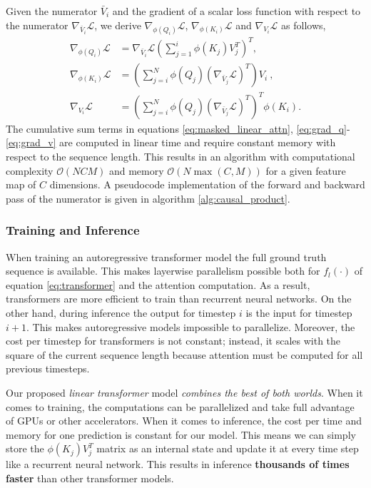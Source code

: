 \documentclass{article}
\newcommand{\linear}{\emph{linear transformer}}
\newcommand{\bigO}[1]{\mathcal{O}\left(#1\right)}
\newcommand{\fe}[1]{\phi\left(#1\right)}
\newcommand{\calL}{\mathcal{L}}
\begin{document}
Given the numerator $\bar{V}_i$ and the gradient of a scalar loss function with
respect to the numerator $\nabla_{\bar{V}_i}\calL$, we derive
$\nabla_{\fe{Q_i}}\calL$, $\nabla_{\fe{K_i}}\calL$ and $\nabla_{V_i}\calL$ as follows,
\begin{align}
    \nabla_{\fe{Q_i}} \calL &= \nabla_{\bar{V}_i}\calL
        \left(\sum_{j=1}^i \fe{K_j} V_j^T\right)^T,
        \label{eq:grad_q} \\
    \nabla_{\fe{K_i}}\calL &= \left(\sum_{j=i}^N \fe{Q_j}
        \left(\nabla_{\bar{V}_j}\calL\right)^T\right) V_i\ ,
        \label{eq:grad_k} \\
    \nabla_{V_i}\calL &= \left(\sum_{j=i}^N \fe{Q_j}
        \left(\nabla_{\bar{V}_j}\calL\right)^T\right)^T \fe{K_i}.
        \label{eq:grad_v}
\end{align}
The cumulative sum terms in equations \ref{eq:masked_linear_attn},
\ref{eq:grad_q}-\ref{eq:grad_v} are computed in linear time and require
constant memory with respect to the sequence length. This results in an
algorithm with computational complexity $\bigO{N C M}$ and memory $\bigO{N
\max\left(C, M\right)}$ for a given feature map of $C$ dimensions. A pseudocode
implementation of the forward and backward pass of the numerator is given in
algorithm \ref{alg:causal_product}.

\subsubsection{Training and Inference}

When training an autoregressive transformer model the full ground truth
sequence is available. This makes layerwise parallelism possible both for
$f_l(\cdot)$ of equation \ref{eq:transformer} and the attention computation.
As a result, transformers are more efficient to train than recurrent neural
networks. On the other hand, during inference the output for timestep $i$ is
the input for timestep $i+1$. This makes autoregressive models impossible to
parallelize. Moreover, the cost per timestep for transformers is not constant;
instead, it scales with the square of the current sequence length because
attention must be computed for all previous timesteps.

Our proposed \linear{} model \emph{combines the best of both worlds}.
When it comes to training, the computations can be parallelized and take full
advantage of GPUs or other accelerators. When it comes to inference, the cost
per time and memory for one prediction is constant for our model. This means we
can simply store the $\fe{K_j}V_j^T$ matrix as an internal state and update it
at every time step like a recurrent neural network. This results in inference
\textbf{thousands of times faster} than other transformer models.
\end{document}
